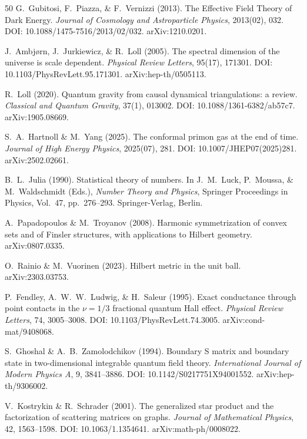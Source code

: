 \documentclass[aps,prd,twocolumn,superscriptaddress,nofootinbib]{revtex4-2}
\begin{document}
\begin{thebibliography}{50}
G.~Gubitosi, F.~Piazza, \& F.~Vernizzi (2013).
The Effective Field Theory of Dark Energy.
\textit{Journal of Cosmology and Astroparticle Physics}, 2013(02), 032.
DOI: 10.1088/1475-7516/2013/02/032.
arXiv:1210.0201.

J.~Ambj\o{}rn, J.~Jurkiewicz, \& R.~Loll (2005).
The spectral dimension of the universe is scale dependent.
\textit{Physical Review Letters}, 95(17), 171301.
DOI: 10.1103/PhysRevLett.95.171301.
arXiv:hep-th/0505113.

R.~Loll (2020).
Quantum gravity from causal dynamical triangulations: a review.
\textit{Classical and Quantum Gravity}, 37(1), 013002.
DOI: 10.1088/1361-6382/ab57c7.
arXiv:1905.08669.

S.~A.~Hartnoll \& M.~Yang (2025).
The conformal primon gas at the end of time.
\textit{Journal of High Energy Physics}, 2025(07), 281.
DOI: 10.1007/JHEP07(2025)281.
arXiv:2502.02661.

B.~L.~Julia (1990).
Statistical theory of numbers.
In J.~M.~Luck, P.~Moussa, \& M.~Waldschmidt (Eds.), \textit{Number Theory and Physics},
Springer Proceedings in Physics, Vol.~47, pp.\ 276--293.
Springer-Verlag, Berlin.

A.~Papadopoulos \& M.~Troyanov (2008).
Harmonic symmetrization of convex sets and of Finsler structures, with applications to Hilbert geometry.
arXiv:0807.0335.

O.~Rainio \& M.~Vuorinen (2023).
Hilbert metric in the unit ball.
arXiv:2303.03753.

P.~Fendley, A.~W.~W.~Ludwig, \& H.~Saleur (1995).
Exact conductance through point contacts in the $\nu=1/3$ fractional quantum Hall effect.
\textit{Physical Review Letters}, 74, 3005--3008.
DOI: 10.1103/PhysRevLett.74.3005. arXiv:cond-mat/9408068.

S.~Ghoshal \& A.~B.~Zamolodchikov (1994).
Boundary S matrix and boundary state in two-dimensional integrable quantum field theory.
\textit{International Journal of Modern Physics A}, 9, 3841--3886.
DOI: 10.1142/S0217751X94001552. arXiv:hep-th/9306002.

V.~Kostrykin \& R.~Schrader (2001).
The generalized star product and the factorization of scattering matrices on graphs.
\textit{Journal of Mathematical Physics}, 42, 1563--1598.
DOI: 10.1063/1.1354641. arXiv:math-ph/0008022.


\end{thebibliography}
\end{document}
